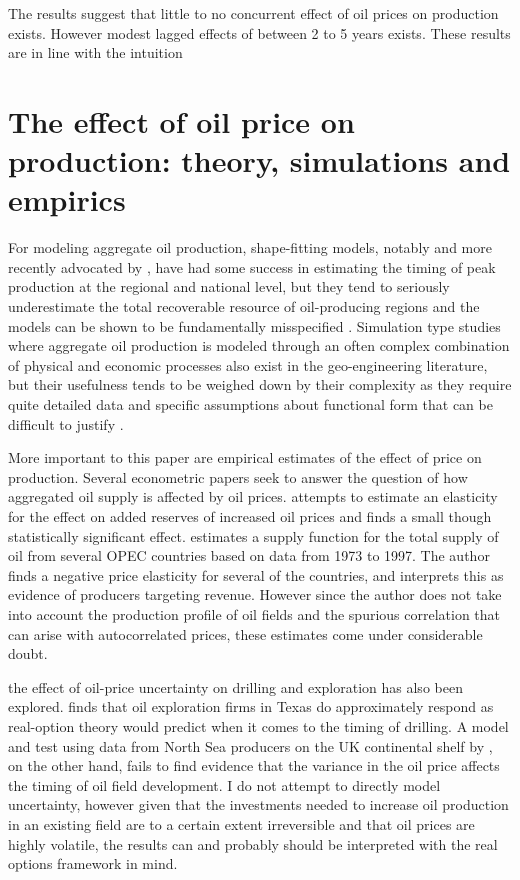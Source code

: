 \documentclass[11pt]{article}
\begin{document}
The results suggest that little to no concurrent effect of oil prices on production exists.  However modest lagged effects of between 2 to 5 years exists.  These results are in line with the intuition

\FloatBarrier
\section{The effect of oil price on production: theory, simulations and empirics}

For modeling aggregate oil production, shape-fitting models, notably \citet{hubbert_energy_1962} and more recently advocated by \citet{deffeyes_hubberts_2001}, have had some success in estimating the timing of peak production at the regional and national level, but they tend to seriously underestimate the total recoverable resource of oil-producing regions and the models can be shown to be fundamentally misspecified \citep{boyce_prediction_2013}.   Simulation type studies where aggregate oil production is modeled through an often complex combination of physical and economic processes also exist in the geo-engineering literature, but their usefulness tends to be weighed down by their complexity as they require quite detailed data and specific assumptions about functional form that can be difficult to justify \citet{brandt_review_2010}.

More important to this paper are empirical estimates of the effect of price on production. Several econometric papers seek to answer the question of how aggregated oil supply is affected by oil prices.  \citet{farzin_impact_2001} attempts to estimate an elasticity for the effect on added reserves of increased oil prices and finds a small though statistically significant effect.  \citet{ramcharran_oil_2002} estimates a supply function for the total supply of oil from several OPEC countries based on data from 1973 to 1997.  The author finds a negative price elasticity for several of the countries, and interprets this as evidence of producers targeting revenue.  However since the author does not take into account the production profile of oil fields and the spurious correlation that can arise with autocorrelated prices, these estimates come under considerable doubt.  

the effect of oil-price uncertainty on drilling and exploration has also been explored.  \citet{kellogg_effect_2014} finds that oil exploration firms in Texas do approximately respond as real-option theory would predict when it comes to the timing of drilling.  A model and test using data from North Sea producers on the UK continental shelf by \citet{hurn_geology_1994}, on the other hand, fails to find evidence that the variance in the oil price affects the timing of oil field development.  I do not attempt to directly model uncertainty, however given that the investments needed to increase oil production in an existing field are to a certain extent irreversible and that oil prices are highly volatile, the results can and probably should be interpreted with the real options framework in mind.  
\end{document}
